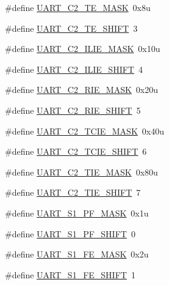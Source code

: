 \begin{DoxyCompactItemize}
\#define \hyperlink{group___u_a_r_t___register___masks_ga3ac02e42b689641339aadf50ba868492}{U\+A\+R\+T\+\_\+\+C2\+\_\+\+T\+E\+\_\+\+M\+A\+SK}~0x8u
\item 
\#define \hyperlink{group___u_a_r_t___register___masks_ga249d6d4f12178dac9cb19afecf1b165c}{U\+A\+R\+T\+\_\+\+C2\+\_\+\+T\+E\+\_\+\+S\+H\+I\+FT}~3
\item 
\#define \hyperlink{group___u_a_r_t___register___masks_ga646831f578232754b613c506d70eb282}{U\+A\+R\+T\+\_\+\+C2\+\_\+\+I\+L\+I\+E\+\_\+\+M\+A\+SK}~0x10u
\item 
\#define \hyperlink{group___u_a_r_t___register___masks_gaccb0ebb3f9bca9de659c4935cd895b06}{U\+A\+R\+T\+\_\+\+C2\+\_\+\+I\+L\+I\+E\+\_\+\+S\+H\+I\+FT}~4
\item 
\#define \hyperlink{group___u_a_r_t___register___masks_gaa2cb31ebff38bb70191a8852eb0216aa}{U\+A\+R\+T\+\_\+\+C2\+\_\+\+R\+I\+E\+\_\+\+M\+A\+SK}~0x20u
\item 
\#define \hyperlink{group___u_a_r_t___register___masks_ga586c552161616eeaf685b689dde5543a}{U\+A\+R\+T\+\_\+\+C2\+\_\+\+R\+I\+E\+\_\+\+S\+H\+I\+FT}~5
\item 
\#define \hyperlink{group___u_a_r_t___register___masks_ga74dd6677d7d42454ae44951e847f13bc}{U\+A\+R\+T\+\_\+\+C2\+\_\+\+T\+C\+I\+E\+\_\+\+M\+A\+SK}~0x40u
\item 
\#define \hyperlink{group___u_a_r_t___register___masks_ga65e55db1b4ca8940fee39d77256fbcaf}{U\+A\+R\+T\+\_\+\+C2\+\_\+\+T\+C\+I\+E\+\_\+\+S\+H\+I\+FT}~6
\item 
\#define \hyperlink{group___u_a_r_t___register___masks_ga0b4f935e44fda4076d7c8964c9d1e409}{U\+A\+R\+T\+\_\+\+C2\+\_\+\+T\+I\+E\+\_\+\+M\+A\+SK}~0x80u
\item 
\#define \hyperlink{group___u_a_r_t___register___masks_gaa216636f49f8f34524a376362792be1c}{U\+A\+R\+T\+\_\+\+C2\+\_\+\+T\+I\+E\+\_\+\+S\+H\+I\+FT}~7
\item 
\#define \hyperlink{group___u_a_r_t___register___masks_ga4116bba67a2cf49c9623e62e3b499ee3}{U\+A\+R\+T\+\_\+\+S1\+\_\+\+P\+F\+\_\+\+M\+A\+SK}~0x1u
\item 
\#define \hyperlink{group___u_a_r_t___register___masks_ga79ce3db2e0a8eaa687b01942adf36468}{U\+A\+R\+T\+\_\+\+S1\+\_\+\+P\+F\+\_\+\+S\+H\+I\+FT}~0
\item 
\#define \hyperlink{group___u_a_r_t___register___masks_ga83b62a5246fdb7f0aaaffb92074c9e0f}{U\+A\+R\+T\+\_\+\+S1\+\_\+\+F\+E\+\_\+\+M\+A\+SK}~0x2u
\item 
\#define \hyperlink{group___u_a_r_t___register___masks_ga2795a7498ce3e3d09703c4cec6378531}{U\+A\+R\+T\+\_\+\+S1\+\_\+\+F\+E\+\_\+\+S\+H\+I\+FT}~1

\end{DoxyCompactItemize}
